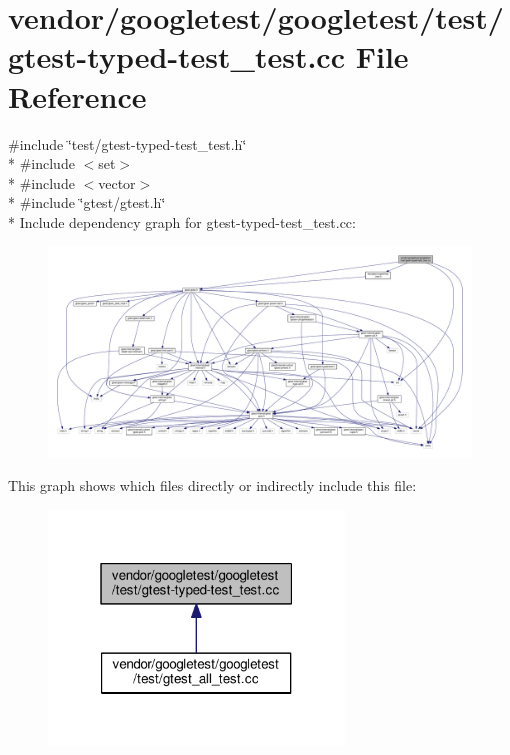 \hypertarget{gtest-typed-test__test_8cc}{}\section{vendor/googletest/googletest/test/gtest-\/typed-\/test\+\_\+test.cc File Reference}
\label{gtest-typed-test__test_8cc}
{\ttfamily \#include \char`\"{}test/gtest-\/typed-\/test\+\_\+test.\+h\char`\"{}}\\*
{\ttfamily \#include $<$set$>$}\\*
{\ttfamily \#include $<$vector$>$}\\*
{\ttfamily \#include \char`\"{}gtest/gtest.\+h\char`\"{}}\\*
Include dependency graph for gtest-\/typed-\/test\+\_\+test.cc\+:\nopagebreak
\begin{figure}[H]
\begin{center}
\leavevmode
\includegraphics[width=350pt]{gtest-typed-test__test_8cc__incl}
\end{center}
\end{figure}
This graph shows which files directly or indirectly include this file\+:\nopagebreak
\begin{figure}[H]
\begin{center}
\leavevmode
\includegraphics[width=223pt]{gtest-typed-test__test_8cc__dep__incl}
\end{center}
\end{figure}
